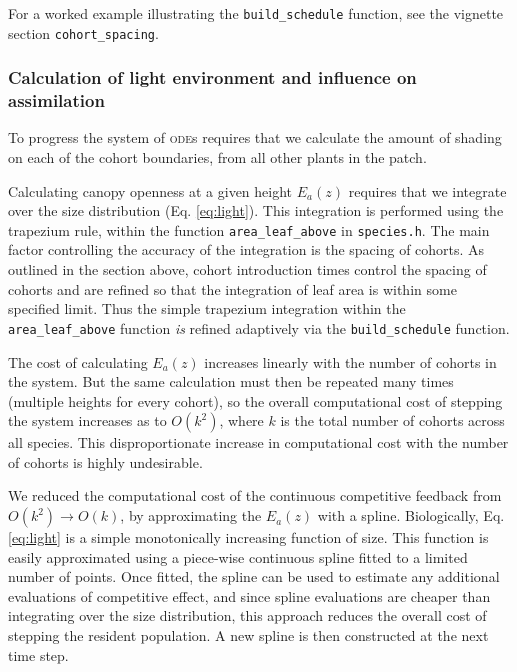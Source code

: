 \documentclass[10pt,twoside]{article}
\begin{document}
For a worked example illustrating the \texttt{build\_schedule} function,
see the vignette section \texttt{cohort\_spacing}.

\subsubsection{Calculation of light environment and influence on
assimilation}\label{calculation-of-light-environment-and-influence-on-assimilation}

To progress the system of \textsc{ode}s requires that we calculate the amount of
shading on each of the cohort boundaries, from all other plants in the
patch.

Calculating canopy openness at a given height \(E_a(z)\) requires that
we integrate over the size distribution (Eq. \ref{eq:light}). This
integration is performed using the trapezium rule, within the function
\texttt{area\_leaf\_above} in \texttt{species.h}. The main factor
controlling the accuracy of the integration is the spacing of cohorts.
As outlined in the section above, cohort introduction times control the
spacing of cohorts and are refined so that the integration of leaf area
is within some specified limit. Thus the simple trapezium integration
within the \texttt{area\_leaf\_above} function \emph{is} refined
adaptively via the \texttt{build\_schedule} function.

The cost of calculating \(E_a(z)\) increases linearly with the number of
cohorts in the system. But the same calculation must then be repeated
many times (multiple heights for every cohort), so the overall computational cost
of stepping the system increases as to \(O(k^2)\), where \(k\) is the
total number of cohorts across all species. This disproportionate
increase in computational cost with the number of cohorts is highly undesirable.

We reduced the computational cost of the continuous competitive feedback
from \(O(k^2) \rightarrow O(k)\), by approximating the \(E_a(z)\) with a
spline. Biologically, Eq. \ref{eq:light} is a simple monotonically
increasing function of size. This function is easily
approximated using a piece-wise continuous spline fitted to a limited
number of points. Once fitted, the spline can be used to estimate any
additional evaluations of competitive effect, and since spline
evaluations are cheaper than integrating over the size distribution,
this approach reduces the overall cost of stepping the resident
population. A new spline is then constructed at the next time step.
\end{document}
